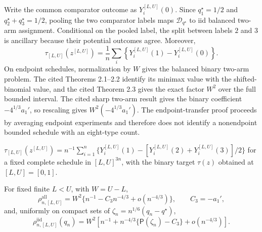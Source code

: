 Write the common comparator outcome as \(Y_i^{[L,U]}(0)\).  Since
\(q_1^\star=1/2\) and \(q_2^\star+q_3^\star=1/2\), pooling the two comparator labels maps \(\mathcal D_{q^\star}\) to iid balanced two-arm assignment.  Conditional on the pooled label, the split between labels \(2\) and \(3\) is ancillary because their potential outcomes agree.  Moreover,
\[
\tau_{[L,U]}(z^{[L,U]})
=\frac1n\sum_i\left\{Y_i^{[L,U]}(1)-Y_i^{[L,U]}(0)\right\}.
\]
On endpoint schedules, normalization by \(W\) gives the balanced binary two-arm problem.  The cited Theorems 2.1--2.2 identify its minimax value with the shifted-binomial value, and the cited Theorem 2.3 gives the exact factor \(W^2\) over the full bounded interval.  The cited sharp two-arm result gives the binary coefficient \(-4^{1/3}a_1'\), so rescaling gives \(W^2(-4^{1/3}a_1')\).  The endpoint-transfer proof proceeds by averaging endpoint experiments and therefore does not identify a nonendpoint bounded schedule with an eight-type count.

\(\tau_{[L,U]}(z^{[L,U]})=n^{-1}\sum_{i=1}^n\{Y_i^{[L,U]}(1)-[Y_i^{[L,U]}(2)+Y_i^{[L,U]}(3)]/2\}\) for a fixed complete schedule in \([L,U]^{3n}\), with the binary target \(\tau(z)\) obtained at \([L,U]=[0,1]\).

For fixed finite \(L<U\), with \(W=U-L\),
\[
\rho_{n,[L,U]}^{\mathrm{all}}
=W^2\{n^{-1}-C_3n^{-4/3}+o(n^{-4/3})\},
\qquad C_3=-a_1',
\]
and, uniformly on compact sets of \(\zeta_n=n^{1/6}(q_n-q^\star)\),
\[
\rho_{n,[L,U]}^{\mathrm{iid}}(q_n)
=W^2\left[n^{-1}+n^{-4/3}\{\mathsf P(\zeta_n)-C_3\}
+o(n^{-4/3})\right].
\]
